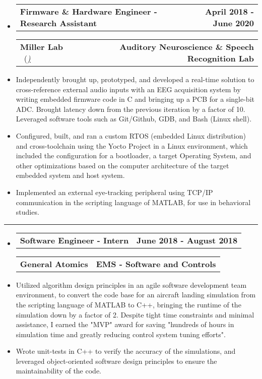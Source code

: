 \documentclass[10pt,letterpaper]{article}
\makeatletter
\newcommand{\header}[2]
{
	\begin{tabular*}{\linewidth}{l @{\extracolsep{\fill}} r}
		\hspace{-27pt} #1 & #2 \\
	\end{tabular*}
}
\makeatother
\begin{document}
\begin{itemize}
	\item[]
		\header
			{\textbf{Firmware \& Hardware Engineer - Research Assistant}} 
			{\textbf{April 2018 - June 2020}}
		\header
		{\textbf{Miller Lab} \ (\href{https://millerlab.faculty.ucdavis.edu}{\small \emph{\underline{\smash{millerlab.faculty.ucdavis.edu})}}} }
			{\textbf{Auditory Neuroscience \& Speech Recognition Lab}} 
		\item
			Independently brought up, prototyped, and developed a real-time solution to cross-reference external audio inputs with an EEG acquisition system by writing embedded firmware code in C and bringing up a PCB for a single-bit ADC. Brought latency down from the previous iteration by a factor of 10. Leveraged software tools such as Git/Github, GDB, and Bash (Linux shell).
		\item 
			Configured, built, and ran a custom RTOS (embedded Linux distribution) and cross-toolchain using the Yocto Project in a Linux environment, which included the configuration for a bootloader, a target Operating System, and other optimizations based on the computer architecture of the target embedded system and host system.
		\item 
			Implemented an external eye-tracking peripheral using TCP/IP communication in the scripting language of MATLAB, for use in behavioral studies.
\end{itemize}

\hrule

\begin{itemize}
	\item[]
		\header
			{\textbf{Software Engineer - Intern}} 
			{\textbf{June 2018 - August 2018}}
		\header
			{\textbf{General Atomics}}
			{\textbf{EMS - Software and Controls}} 
		\item
			Utilized algorithm design principles in an agile software development team environment, to convert the code base for an aircraft landing simulation from the scripting language of MATLAB to C++, bringing the runtime of the simulation down by a factor of 2. Despite tight time constraints and minimal assistance, I earned the "MVP" award for saving "hundreds of hours in simulation time and greatly reducing control system tuning efforts".
		\item
			Wrote unit-tests in C++ to verify the accuracy of the simulations, and leveraged object-oriented software design principles to ensure the maintainability of the code.


\end{itemize}
\end{document}
